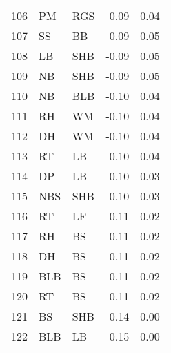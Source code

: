 \begin{table}[ht]
\begin{tabular}{rllrr}
  106 & PM & RGS & 0.09 & 0.04 \\ 
  107 & SS & BB & 0.09 & 0.05 \\ 
  108 & LB & SHB & -0.09 & 0.05 \\ 
  109 & NB & SHB & -0.09 & 0.05 \\ 
  110 & NB & BLB & -0.10 & 0.04 \\ 
  111 & RH & WM & -0.10 & 0.04 \\ 
  112 & DH & WM & -0.10 & 0.04 \\ 
  113 & RT & LB & -0.10 & 0.04 \\ 
  114 & DP & LB & -0.10 & 0.03 \\ 
  115 & NBS & SHB & -0.10 & 0.03 \\ 
  116 & RT & LF & -0.11 & 0.02 \\ 
  117 & RH & BS & -0.11 & 0.02 \\ 
  118 & DH & BS & -0.11 & 0.02 \\ 
  119 & BLB & BS & -0.11 & 0.02 \\ 
  120 & RT & BS & -0.11 & 0.02 \\ 
  121 & BS & SHB & -0.14 & 0.00 \\ 
  122 & BLB & LB & -0.15 & 0.00 \\ 
   \hline
\end{tabular}
\end{table}